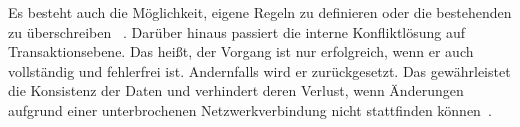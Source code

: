 Es besteht auch die Möglichkeit, eigene Regeln zu definieren oder die bestehenden zu überschreiben ~\cite{realm_conflict}.
Darüber hinaus passiert die interne Konfliktlösung auf Transaktionsebene.
Das heißt, der Vorgang ist nur erfolgreich, wenn er auch vollständig und fehlerfrei ist. Andernfalls wird er zurückgesetzt.
Das gewährleistet die Konsistenz der Daten und verhindert deren Verlust, wenn Änderungen aufgrund einer unterbrochenen Netzwerkverbindung nicht stattfinden können~\cite{realm_offline_whitepaper}.